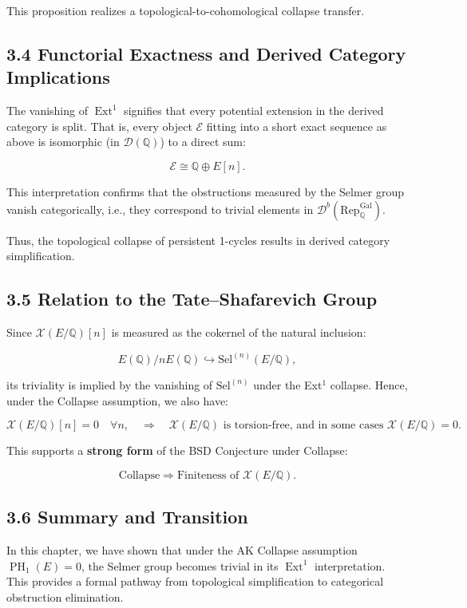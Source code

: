 \documentclass[11pt]{article}
\DeclareMathOperator{\Ext}{Ext}
\DeclareMathOperator{\PH}{PH}
\newcommand{\QQ}{\mathbb{Q}}
\newcommand{\Sha}{\mathcal{X}}
\begin{document}
This proposition realizes a topological-to-cohomological collapse transfer.

\subsection{3.4 Functorial Exactness and Derived Category Implications}

The vanishing of $\Ext^1$ signifies that every potential extension in the derived category is split. That is, every object $\mathcal{E}$ fitting into a short exact sequence as above is isomorphic (in $\mathcal{D}(\QQ)$) to a direct sum:

\[
\mathcal{E} \cong \QQ \oplus E[n].
\]

This interpretation confirms that the obstructions measured by the Selmer group vanish categorically, i.e., they correspond to trivial elements in $\mathcal{D}^b(\mathrm{Rep}_{\QQ}^{\text{Gal}})$.

Thus, the topological collapse of persistent 1-cycles results in derived category simplification.

\subsection{3.5 Relation to the Tate–Shafarevich Group}

Since $\Sha(E/\QQ)[n]$ is measured as the cokernel of the natural inclusion:

\[
E(\QQ)/nE(\QQ) \hookrightarrow \mathrm{Sel}^{(n)}(E/\QQ),
\]

its triviality is implied by the vanishing of $\mathrm{Sel}^{(n)}$ under the Ext$^1$ collapse.  
Hence, under the Collapse assumption, we also have:

\[
\Sha(E/\QQ)[n] = 0 \quad \forall n,
\quad \Rightarrow \quad \Sha(E/\QQ) \text{ is torsion-free, and in some cases } \Sha(E/\QQ) = 0.
\]

This supports a \textbf{strong form} of the BSD Conjecture under Collapse:

\[
\text{Collapse} \Rightarrow \text{Finiteness of } \Sha(E/\QQ).
\]

\subsection{3.6 Summary and Transition}

In this chapter, we have shown that under the AK Collapse assumption $\PH_1(E)=0$, the Selmer group becomes trivial in its $\Ext^1$ interpretation.  
This provides a formal pathway from topological simplification to categorical obstruction elimination.
\end{document}
